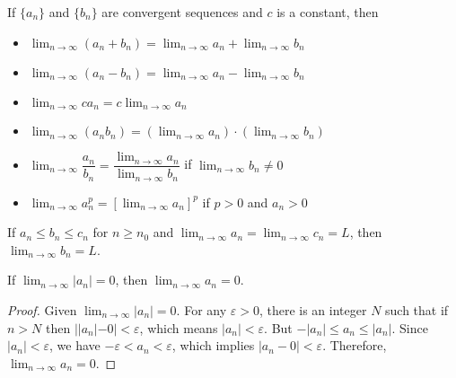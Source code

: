 \documentclass{article}
\theoremstyle{mystyle}
\begin{document}
\begin{tcolorbox}[colback=white, colframe=orange!80!white, title=Limit Laws for Sequences (Theorem 2), boxrule=0.5mm, arc=3mm]
If \(\{a_n\}\) and \(\{b_n\}\) are convergent sequences and \(c\) is a constant, then
\begin{itemize}
    \item \( \lim_{n\to\infty} (a_n + b_n) = \lim_{n\to\infty} a_n + \lim_{n\to\infty} b_n \)
    \item \( \lim_{n\to\infty} (a_n - b_n) = \lim_{n\to\infty} a_n - \lim_{n\to\infty} b_n \)
    \item \( \lim_{n\to\infty} ca_n = c \lim_{n\to\infty} a_n \)
    \item \( \lim_{n\to\infty} (a_n b_n) = (\lim_{n\to\infty} a_n) \cdot (\lim_{n\to\infty} b_n) \)
    \item \( \lim_{n\to\infty} \dfrac{a_n}{b_n} = \dfrac{\lim_{n\to\infty} a_n}{\lim_{n\to\infty} b_n} \) if \( \lim_{n\to\infty} b_n \neq 0 \)
    \item \( \lim_{n\to\infty} a_n^p = \left[\lim_{n\to\infty} a_n\right]^p \) if \(p>0\) and \(a_n>0\)
\end{itemize}
\end{tcolorbox}

\begin{tcolorbox}[colback=white, colframe=orange!80!white, title=The Squeeze Theorem for Sequences (Theorem 3), boxrule=0.5mm, arc=3mm]
If \(a_n \le b_n \le c_n\) for \(n \ge n_0\) and \( \lim_{n\to\infty} a_n = \lim_{n\to\infty} c_n = L \), then \( \lim_{n\to\infty} b_n = L \).
\end{tcolorbox}

\begin{tcolorbox}[colback=white, colframe=orange!80!white, title=Theorem 4, boxrule=0.5mm, arc=3mm]
If \( \lim_{n\to\infty} |a_n| = 0 \), then \( \lim_{n\to\infty} a_n = 0 \).
\end{tcolorbox}
\begin{proof}
Given \( \lim_{n\to\infty} |a_n| = 0 \). For any \(\varepsilon > 0\), there is an integer \(N\) such that if \(n>N\) then \(||a_n|-0| < \varepsilon\), which means \(|a_n| < \varepsilon\). But \( -|a_n| \le a_n \le |a_n| \). Since \(|a_n|<\varepsilon\), we have \(-\varepsilon < a_n < \varepsilon\), which implies \(|a_n - 0| < \varepsilon\). Therefore, \( \lim_{n\to\infty} a_n = 0 \).
\end{proof}
\end{document}
